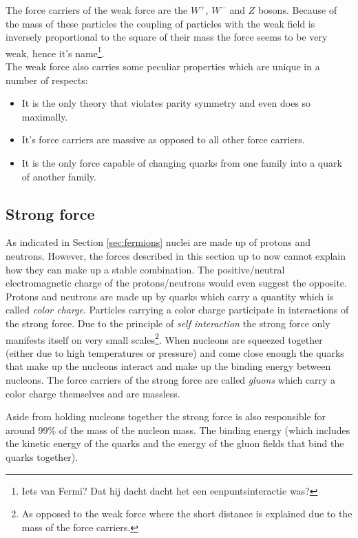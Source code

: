 The force carriers of the weak force are the $W^+$, $W^-$ and $Z$ bosons. Because of the mass of these particles the coupling of particles with the weak field is inversely proportional to the square of their mass the force seems to be very weak, hence it's name\footnote{Iets van Fermi?  Dat hij dacht dacht het een eenpuntsinteractie was?}.\\
The weak force also carries some peculiar properties which are unique in a number of respects:
\begin{itemize}
\item It is the only theory that violates parity symmetry and even does so maximally.
\item It's force carriers are massive as opposed to all other force carriers.
\item It is the only force capable of changing quarks from one family into a quark of another family.
\end{itemize}

\subsection*{Strong force}
As indicated in Section \ref{sec:fermions} nuclei are made up of protons and neutrons. However, the forces described in this section up to now cannot explain how they can make up a stable combination. The positive/neutral electromagnetic charge of the protons/neutrons would even suggest the opposite. Protons and neutrons are made up by quarks which carry a quantity which is called \textit{color charge}. Particles carrying a color charge participate in interactions of the strong force. Due to the principle of \textit{self interaction} the strong force only manifests itself on very small scales\footnote{As opposed to the weak force where the short distance is explained due to the mass of the force carriers.}. When nucleons are squeezed together (either due to high temperatures or pressure) and come close enough the quarks that make up the nucleons interact and make up the binding energy between nucleons.
The force carriers of the strong force are called \textit{gluons} which carry a color charge themselves and are massless.

Aside from holding nucleons together the strong force is also responsible for around 99\% of the mass of the nucleon mass. The binding energy (which includes the kinetic energy of the quarks and the energy of the gluon fields that bind the quarks together).

